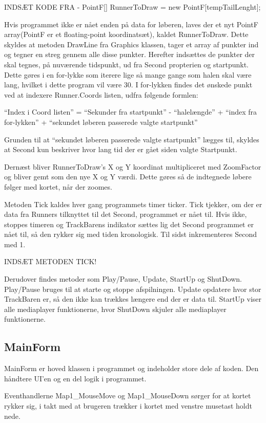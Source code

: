 INDSÆT KODE FRA - PointF[] RunnerToDraw = new PointF[tempTailLenght];

Hvis programmet ikke er nået enden på data for løberen, laves der et nyt PointF array(PointF er et floating-point koordinatsæt), kaldet RunnerToDraw. Dette skyldes at metoden DrawLine fra Graphics klassen, tager et array af punkter ind og tegner en streg gennem alle disse punkter. Herefter indsættes de punkter der skal tegnes, på nuværende tidspunkt, ud fra Second propterien og startpunkt. Dette gøres i en for-lykke som iterere lige så mange gange som halen skal være lang, hvilket i dette program vil være 30. I for-lykken findes det ønskede punkt ved at indexere Runner.Coords listen, udfra følgende formlen:
 
“Index i Coord listen” = “Sekunder fra startpunkt” - “halelængde” + “index fra for-lykken”  + “sekundet løberen passerede valgte startpunkt”

Grunden til at “sekundet løberen passerede valgte startpunkt” lægges til, skyldes at Second kun beskriver hvor lang tid der er gået siden valgte Startpunkt. 

Dernæst bliver RunnerToDraw’s X og Y koordinat multipliceret med ZoomFactor og bliver gemt som den nye X og Y værdi. Dette gøres så de indtegnede løbere følger med kortet, når der zoomes. 

Metoden Tick kaldes hver gang programmets timer ticker. Tick tjekker, om der er data fra Runners tilknyttet til det Second, programmet er nået til. Hvis ikke, stoppes timeren og TrackBarens indikator sættes lig det Second programmet er nået til, så den rykker sig med tiden kronologisk. Til sidst inkrementeres Second med 1.

INDSÆT METODEN TICK!

Derudover findes metoder som Play/Pause, Update, StartUp og ShutDown. Play/Pause bruges til at starte og stoppe afspilningen. Update opdatere hvor stor TrackBaren er, så den ikke kan trækkes længere end der er data til. StartUp viser alle mediaplayer funktionerne, hvor ShutDown skjuler alle mediaplayer funktionerne. 

\subsection{MainForm}
MainForm er hoved klassen i programmet og indeholder store dele af koden. Den håndtere UI’en og en del logik i programmet. 

Eventhandlerne Map1\_MouseMove og Map1\_MouseDown sørger for at kortet rykker sig, i takt med at brugeren trækker i kortet med venstre musetast holdt nede. 


